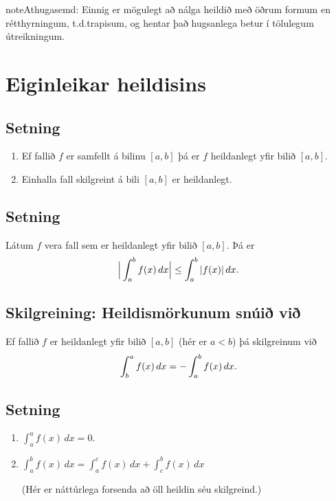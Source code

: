 \documentclass[b5paper,10pt,icelandic]{sphinxmanual}
\begin{document}
\begin{notice}{note}{Athugasemd:}
Einnig er mögulegt að nálga heildið með öðrum formum en rétthyrningum,
t.d.trapisum, og hentar það hugsanlega betur í
tölulegum útreikningum.
\end{notice}


\section{Eiginleikar heildisins}
\label{kafli06:eiginleikar-heildisins}

\subsection{Setning}
\label{kafli06:setning}\begin{enumerate}
\item {} 
Ef fallið \(f\) er samfellt á bilinu \([a, b]\) þá er
\(f\) heildanlegt yfir bilið \([a, b]\).

\item {} 
Einhalla fall skilgreint á bili \([a,b]\) er heildanlegt.

\end{enumerate}


\subsection{Setning}
\label{kafli06:id2}
Látum \(f\) vera fall sem er heildanlegt yfir bilið \([a, b]\).
Þá er
\begin{gather}
\begin{split}\Big|\int_a^b f(x)\,dx\Big|\leq \int_a^b |f(x)|\,dx.\end{split}\notag
\end{gather}

\subsection{Skilgreining: Heildismörkunum snúið við}
\label{kafli06:skilgreining-heildismorkunum-snui-vi}
Ef fallið \(f\) er heildanlegt yfir bilið \([a,b]\) (hér er
\(a<b\)) þá skilgreinum við
\begin{gather}
\begin{split}\int_b^a f(x)\,dx=-\int_a^b f(x)\,dx.\end{split}\notag
\end{gather}

\subsection{Setning}
\label{kafli06:id3}\begin{enumerate}
\item {} 
\(\int_a^a f(x)\,dx=0\).

\item {} 
\(\int_a^b f(x)\,dx=\int_a^c f(x)\,dx+\int_c^b f(x)\,dx\)

(Hér er náttúrlega forsenda að öll heildin séu skilgreind.)

\end{enumerate}
\end{document}
